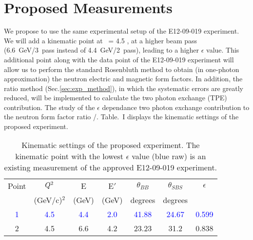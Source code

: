 \section{Proposed Measurements} 
\label{prop}

We propose to use the same experimental setup of the E12-09-019 experiment. We will add a kinematic point at \qsq~= 4.5 \gevcsq, at a higher beam pass (6.6~GeV/3~pass instead of 4.4~GeV/2~pass), leading to a higher $\epsilon$ value. This additional point along with the data point of the E12-09-019 experiment will allow us to perform the standard Rosenbluth method to obtain (in one-photon approximation) the neutron electric and magnetic form factors. In addition, the ratio method (Sec.\ref{sec:exp_method}), in which the systematic errors are greatly reduced, will be implemented to calculate  the two photon exchange (TPE) contribution. The study of the $\epsilon$ dependance two photon exchange contribution to the neutron form factor ratio \gen/\gmn. Table.~I displays the kinematic settings of the proposed experiment. 

\begin{table}[h] 
\centering
\begin{tabular}{|c|c|c|c|c|c|c|}
\hline
\small{Point} & $Q\textsuperscript{2}$  & E & E$'$  & $\theta_{BB}$ & $\theta_{SBS}$ & $\epsilon$ \\
& (GeV/c)$^2$ & (GeV) & (GeV)  &\; degrees\; & \; degrees \;  &   \\
\hline
\textcolor{blue}
 1&\textcolor{blue} {4.5} & \textcolor{blue}{4.4} & \textcolor{blue}{2.0} & \textcolor{blue}{41.88}  & \textcolor{blue}{24.67} &\; \textcolor{blue}{0.599} \;\\
\hline
2 & 4.5  &  6.6  &  4.2  & 23.23  &  31.2  &  0.838 \\
\hline
\end{tabular} 
\caption{Kinematic settings of the proposed experiment. The kinematic point with the lowest $\epsilon$ value (blue raw) is an existing measurement of the approved  E12-09-019 experiment.}
\label{tab:propkin}
\end{table}

